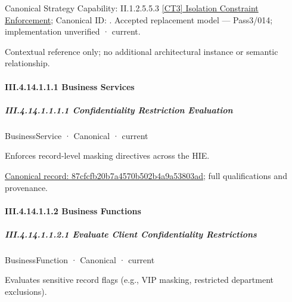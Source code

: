 {\small Canonical Strategy Capability: II.1.2.5.5.3 \hyperref[element:2475396dd27745fe80df6c887c064f8a]{[CT3] Isolation Constraint Enforcement}; Canonical ID: \texttt{}. Accepted replacement model — Pass3/014; implementation unverified · current.}\par
Contextual reference only; no additional architectural instance or semantic relationship.\par
\paragraph*{III.4.14.1.1.1 Business Services}
\label{navigation:III.4.14.1.1.1}

\subparagraph*{III.4.14.1.1.1.1 Confidentiality Restriction Evaluation}
\label{navigation:III.4.14.1.1.1.1}

\label{element:87cfcfb20b7a4570b502b4a9a53803ad}
{\small BusinessService · Canonical · current}\par

Enforces record-level masking directives across the HIE.


{\footnotesize \href{../../../../../../../continuum/business/business-service/87cfcfb20b7a4570b502b4a9a53803ad.md}{Canonical record: 87cfcfb20b7a4570b502b4a9a53803ad}; full qualifications and provenance.}\par
\paragraph*{III.4.14.1.1.2 Business Functions}
\label{navigation:III.4.14.1.1.2}

\subparagraph*{III.4.14.1.1.2.1 Evaluate Client Confidentiality Restrictions}
\label{navigation:III.4.14.1.1.2.1}

\label{element:a61324c3ef734910af5886f048cd3bf5}
{\small BusinessFunction · Canonical · current}\par

Evaluates sensitive record flags (e.g., VIP masking, restricted department exclusions).


